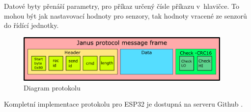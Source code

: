 Datové byty přenáší parametry, pro příkaz určený čísle příkazu v~hlavičce.
To mohou být jak nastavovací hodnoty pro senzory, tak hodnoty vracené ze senzorů do řídící jednotky.

\begin{figure}[h]
    \begin{small}
        \begin{center}
            \includegraphics[width=400px]{img/Protocol_diagram.png}
        \end{center}
        \caption{Diagram protokolu}
        \label{fig: Diagram protokolu}
    \end{small}
\end{figure}




Kompletní implementace protokolu pro ESP32 je dostupná na serveru Github \cite{protocol}. 


